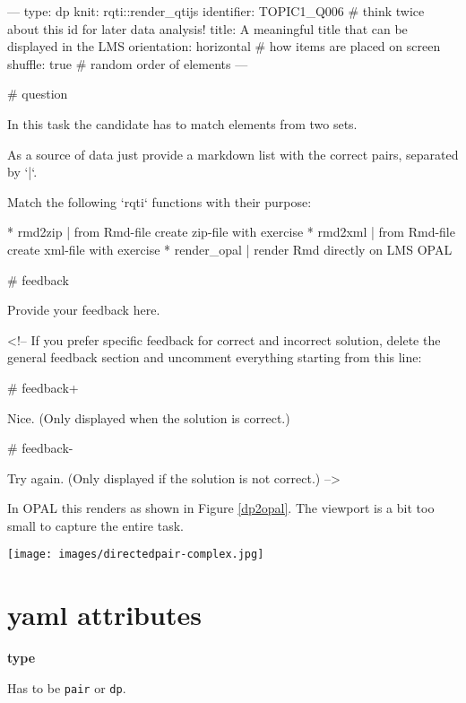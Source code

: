 \documentclass[twoside]{tufte-book}
\newenvironment{Shaded}{}{}
\begin{document}
\begin{Shaded}
\begin{Highlighting}
---
type: dp
knit: rqti::render_qtijs
identifier: TOPIC1_Q006 # think twice about this id for later data analysis!
title: A meaningful title that can be displayed in the LMS
orientation: horizontal # how items are placed on screen
shuffle: true # random order of elements
---

# question

In this task the candidate has to match elements from two sets.

As a source of data just provide a markdown list with the correct pairs,
separated by `|`.

Match the following `rqti` functions with their purpose:

* rmd2zip | from Rmd-file create zip-file with exercise
* rmd2xml | from Rmd-file create xml-file with exercise
* render_opal | render Rmd directly on LMS OPAL


# feedback

Provide your feedback here.

<!-- If you prefer specific feedback for correct and incorrect solution, delete
the general feedback section and uncomment everything starting from this line:

# feedback+

Nice. (Only displayed when the solution is correct.)

# feedback-

Try again. (Only displayed if the solution is not correct.)
-->
\end{Highlighting}
\end{Shaded}

In OPAL this renders as shown in Figure \ref{dp2opal}. The viewport is a bit too small to capture the entire task.

\begin{figure*}
\centering
\texttt{[image: images/directedpair-complex.jpg]}
\caption{\label{dp2opal}More complex directed pair task rendered in OPAL}
\end{figure*}

\section{yaml attributes}\label{yaml-attributes-6}

\noindent\textbf{type}\label{type-6}

Has to be \texttt{pair} or \texttt{dp}.
\end{document}
